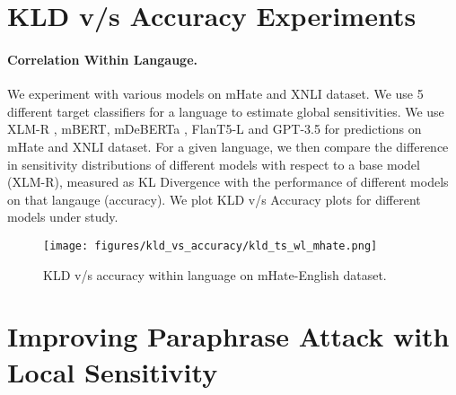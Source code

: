 \section{KLD v/s Accuracy Experiments}
\label{sec:appendix:subsection:kld_vs_acc}


\paragraph{Correlation Within Langauge.}
We experiment with various models on mHate and XNLI dataset. We use 5 different target classifiers for a language to estimate global sensitivities. We use XLM-R \cite{conneau2020unsupervisedcrosslingualrepresentationlearning}, mBERT, mDeBERTa \cite{he2021debertadecodingenhancedbertdisentangled}, FlanT5-L \cite{chung2022scalinginstructionfinetunedlanguagemodels} and GPT-3.5 for predictions on mHate and XNLI dataset. For a given language, we then compare the difference in sensitivity distributions of different models with respect to a base model (XLM-R), measured as KL Divergence with the performance of different models on that langauge (accuracy). We plot KLD v/s Accuracy plots for different models under study. 

\begin{figure}[htbp]
    \texttt{[image: figures/kld\_vs\_accuracy/kld\_ts\_wl\_mhate.png]}
    \caption{KLD v/s accuracy within language on mHate-English dataset.}
    \label{fig:mhate_within_languges}
\end{figure}

\section{Improving Paraphrase Attack with Local Sensitivity}
\label{appendix:paraphraseattack_details}


